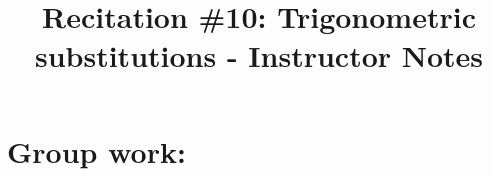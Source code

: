 \documentclass[handout,instructornotes]{ximera}
\title{Recitation \#10: Trigonometric substitutions - Instructor Notes}
\begin{document}
\begin{abstract}		\end{abstract}
\maketitle

\section{Group work:}
\end{document}
